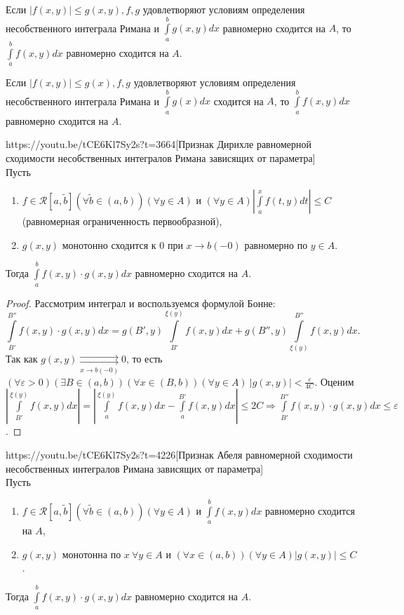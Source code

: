 \begin{corollary}
	Если $|f(x,y)|\leqslant g(x,y), f, g$ удовлетворяют условиям определения несобственного интеграла Римана и $\int
	\limits_a^b g(x,y)dx$ равномерно сходится на $A$, то $\int\limits_a^b f(x,y)dx$ равномерно сходится на $A$.
\end{corollary}
\begin{corollary}
	Если $|f(x,y)|\leqslant g(x), f, g$ удовлетворяют условиям определения несобственного интеграла Римана и $\int
	\limits_a^b g(x)dx$ сходится на $A$, то $\int\limits_a^b f(x,y)dx$ равномерно сходится на $A$.
\end{corollary}

\begin{linkthm}{https://youtu.be/tCE6Kl7Sy2s?t=3664}[Признак Дирихле равномерной сходимости несобственных интегралов Римана зависящих от параметра]\ \\
	Пусть
	\begin{enumerate}
		\item $f\in\mathcal{R}[a, \widetilde{b}](\forall\widetilde{b}\in(a,b))(\forall y\in A)$ и $(\forall y\in A)\left|\int\limits_a^x f(t,y)dt\right|\leqslant C$ (равномерная ограниченность первообразной),
		\item $g(x,y)$ монотонно сходится к 0 при $x\to b(-0)$ равномерно по $y\in A$.
	\end{enumerate}
Тогда $\int\limits_a^b f(x,y)\cdot g(x,y)dx$ равномерно сходится на $A$.
\end{linkthm}

\begin{proof}
	Рассмотрим интеграл и воспользуемся формулой Бонне: $$\int\limits_{B'}^{B''}f(x,y)\cdot g(x,y)dx = g(B',y)\int\limits_{B'}^{\xi(y)}f(x,y)dx+g(B'',y)\int\limits_{\xi(y)}^{B''}f(x,y)dx.$$
	Так как $g(x,y)\underset{x\to b(-0)}{\rightrightarrows} 0$, то есть $(\forall\varepsilon>0)(\exists B\in(a,b))(\forall x\in (B,b))(\forall y\in A)\ |g(x,y)|<\frac{\varepsilon}{4C}$. Оценим $\left|\int\limits_{B'}^{\xi(y)}f(x,y)dx\right|=\left|\int\limits_{a}^{\xi(y)}f(x,y)dx-\int\limits_{a}^{B'}f(x,y)dx\right|\leqslant 2C\Rightarrow \int\limits_{B'}^{B''}f(x,y)\cdot g(x,y)dx\leqslant \varepsilon$.
\end{proof}

\begin{linkthm}{https://youtu.be/tCE6Kl7Sy2s?t=4226}[Признак Абеля равномерной сходимости несобственных интегралов Римана зависящих от параметра]\ \\
Пусть
\begin{enumerate}
	\item $f\in\mathcal{R}[a, \widetilde{b}](\forall\widetilde{b}\in(a,b))(\forall y\in A)$ и $\int\limits_a^b f(x,y)dx$ равномерно сходится на $A$,
	\item $g(x,y)$ монотонна по $x\ \forall y\in A$ и $(\forall x\in (a,b))(\forall y\in A)|g(x,y)|\leqslant C$.
\end{enumerate}
Тогда $\int\limits_a^b f(x,y)\cdot g(x,y)dx$ равномерно сходится на $A$.
\end{linkthm}


